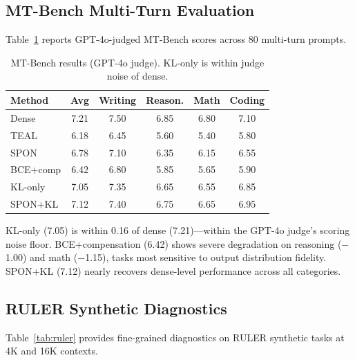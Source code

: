 \documentclass[11pt,a4paper]{article}
\begin{document}
\subsection{MT-Bench Multi-Turn Evaluation}
\label{sec:mtbench}

Table~\ref{tab:mtbench} reports GPT-4o-judged MT-Bench scores across 80 multi-turn prompts.

\begin{table}[t]
\centering
\small
\caption{MT-Bench results (GPT-4o judge). KL-only is within judge noise of dense.}
\label{tab:mtbench}
\begin{tabular}{lccccc}
\toprule
\textbf{Method} & \textbf{Avg} & \textbf{Writing} & \textbf{Reason.} & \textbf{Math} & \textbf{Coding} \\
\midrule
Dense & 7.21 & 7.50 & 6.85 & 6.80 & 7.10 \\
TEAL & 6.18 & 6.45 & 5.60 & 5.40 & 5.80 \\
SPON & 6.78 & 7.10 & 6.35 & 6.15 & 6.55 \\
BCE+comp & 6.42 & 6.80 & 5.85 & 5.65 & 5.90 \\
KL-only & 7.05 & 7.35 & 6.65 & 6.55 & 6.85 \\
SPON+KL & 7.12 & 7.40 & 6.75 & 6.65 & 6.95 \\
\bottomrule
\end{tabular}
\end{table}

KL-only (7.05) is within 0.16 of dense (7.21)---within the GPT-4o judge's scoring noise floor.
BCE+compensation (6.42) shows severe degradation on reasoning ($-$1.00) and math ($-$1.15), tasks most sensitive to output distribution fidelity.
SPON+KL (7.12) nearly recovers dense-level performance across all categories.

\subsection{RULER Synthetic Diagnostics}
\label{sec:ruler}

Table~\ref{tab:ruler} provides fine-grained diagnostics on RULER synthetic tasks at 4K and 16K contexts.
\end{document}

